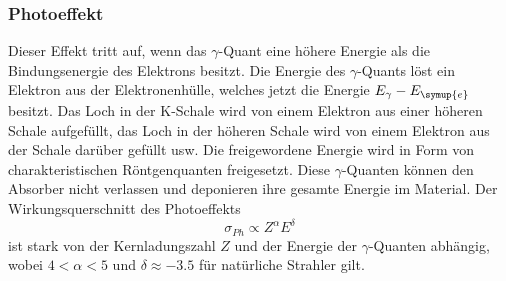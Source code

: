 \subsubsection{Photoeffekt}
Dieser Effekt tritt auf, wenn das $\gamma$-Quant eine höhere Energie als die Bindungsenergie des Elektrons besitzt.
Die Energie des $\gamma$-Quants löst ein Elektron aus der Elektronenhülle, welches jetzt die Energie $E_\gamma-E_{\symup{e}}$ besitzt.
Das Loch in der K-Schale wird von einem Elektron aus einer höheren Schale aufgefüllt, das Loch in der höheren Schale wird von einem Elektron aus der Schale darüber gefüllt usw.
Die freigewordene Energie wird in Form von charakteristischen Röntgenquanten freigesetzt.
Diese $\gamma$-Quanten können den Absorber nicht verlassen und deponieren ihre gesamte Energie im Material.
Der Wirkungsquerschnitt des Photoeffekts
\begin{equation*}
\sigma_{Ph}\propto Z^\alpha E^\delta
\end{equation*}
ist stark von der Kernladungszahl $Z$ und der Energie der $\gamma$-Quanten abhängig, wobei $4<\alpha<5$ und $\delta\approx -3.5$ für natürliche Strahler gilt.

